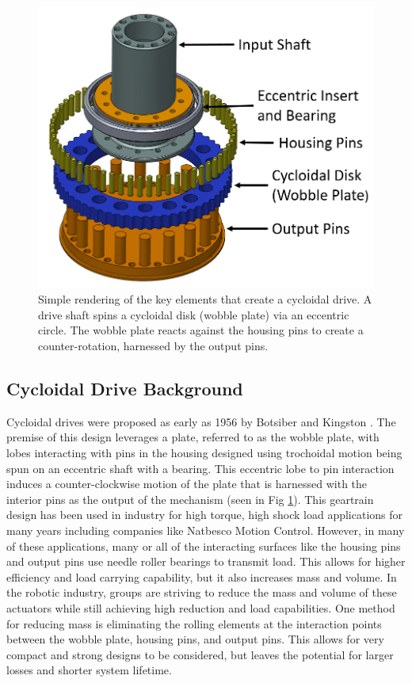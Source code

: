 \begin{figure}[!b]
   \centering
   \includegraphics[width=0.60\linewidth]{fig/cycloid_cartoon_v2}
   \caption{Simple rendering of the key elements that create a cycloidal drive.
   A drive shaft spins a cycloidal disk (wobble plate) via an eccentric circle.
   The wobble plate reacts against the housing pins to create a counter-rotation, harnessed by the output pins.}
   \label{cycloid_cartoon}
\end{figure}

\subsection{Cycloidal Drive Background}
Cycloidal drives were proposed as early as 1956 by Botsiber and Kingston \cite{ref:1956}.
The premise of this design leverages a plate, referred to as the wobble plate, with lobes interacting with pins in the housing designed using trochoidal motion being spun on an eccentric shaft with a bearing.
This eccentric lobe to pin interaction induces a counter-clockwise motion of the plate that is harnessed with the interior pins as the output of the mechanism (seen in Fig \ref{cycloid_cartoon}).
This geartrain design has been used in industry for high torque, high shock load applications for many years including companies like Natbesco Motion Control.
However, in many of these applications, many or all of the interacting surfaces like the housing pins and output pins use needle roller bearings to transmit load.
This allows for higher efficiency and load carrying capability, but it also increases mass and volume.
In the robotic industry, groups are striving to reduce the mass and volume of these actuators while still achieving high reduction and load capabilities.
One method for reducing mass is eliminating the rolling elements at the interaction points between the wobble plate, housing pins, and output pins.
This allows for very compact and strong designs to be considered, but leaves the potential for larger losses and shorter system lifetime.

